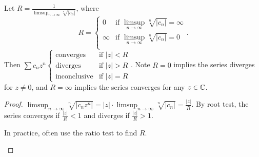 \begin{thm}[39]
	Let $R=\frac{1}{\limsup_{n\to \infty}{\sqrt[n]{|c_{n}|}}}$, where
	\[
		R= \begin{cases}
			0      & \text{if } \limsup_{n\to \infty}{\sqrt[n]{|c_{n}|}}=\infty \\
			\infty & \text{if } \limsup_{n\to \infty}{\sqrt[n]{|c_{n}|}}=0      \\
		\end{cases}.
	\]
	Then $\sum{c_{n}z^{n}} \begin{cases}
			\text{converges}    & \text{if } |z|<R \\
			\text{diverges}     & \text{if } |z|>R \\
			\text{inconclusive} & \text{if } |z|=R
		\end{cases}$. Note $R=0$ implies the series diverges for $z\neq 0$, and $R=\infty$ implies the series converges for any $z \in \mathbb{C}$.
	\begin{proof}
		$\limsup_{n\to \infty}{\sqrt[n]{|c_{n}z^{n}|}}=|z| \cdot \limsup_{n\to \infty}{\sqrt[n]{|c_{n}|}}=\frac{|z|}{R}$.
		By root test, the series converges if $\frac{|z|}{R}<1$ and diverges if $\frac{|z|}{R}>1$.
		\begin{note}
			In practice, often use the ratio test to find $R$.
		\end{note}
	\end{proof}
\end{thm}

